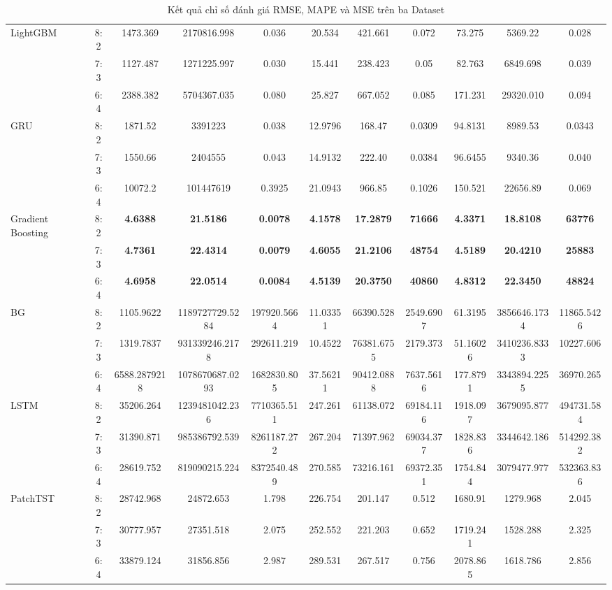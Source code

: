\documentclass[conference]{IEEEtran}
\begin{document}
\begin{table}[H]
\begin{tabular}{|l|c||c||c||c||c||c||c||c||c||c|}
\hline
LightGBM & 8:2 & 1473.369 & 2170816.998 & 0.036 & 20.534 & 421.661 & 0.072 & 73.275 & 5369.22 & 0.028  \\
    & 7:3 & 1127.487 & 1271225.997 & 0.030 & 15.441 & 238.423 & 0.05 & 82.763 & 6849.698 & 0.039  \\
    & 6:4 & 2388.382 & 5704367.035 & 0.080 & 25.827 & 667.052 & 0.085 & 171.231 & 29320.010 & 0.094  \\
\hline
GRU & 8:2 &1871.52  &3391223  &0.038 &12.9796 &168.47 &0.0309 &94.8131 &8989.53 &0.0343 \\
    & 7:3 &1550.66  &2404555  &0.043 &14.9132 &222.40 &0.0384 &96.6455 &9340.36 &0.040 \\
    & 6:4 &10072.2  &101447619  &0.3925 &21.0943 &966.85 &0.1026 &150.521 &22656.89 &0.069 \\
\hline
Gradient Boosting & 8:2 & \textbf{4.6388}  & \textbf{21.5186}  & \textbf{0.0078} & \textbf{4.1578} & \textbf{17.2879} & \textbf{71666} & \textbf{4.3371} & \textbf{18.8108} & \textbf{63776} \\
    & 7:3 & \textbf{4.7361}  & \textbf{22.4314}  & \textbf{0.0079} & \textbf{4.6055} & \textbf{21.2106} & \textbf{48754} & \textbf{4.5189} & \textbf{20.4210} & \textbf{25883} \\
    & 6:4 & \textbf{4.6958}  & \textbf{22.0514}  & \textbf{0.0084} & \textbf{4.5139} & \textbf{20.3750} & \textbf{40860} & \textbf{4.8312} & \textbf{22.3450} & \textbf{48824} \\
\hline
BG & 8:2 & 1105.9622 & 1189727729.5284 & 197920.5664 & 11.03351 &66390.528 &  2549.6907 &  61.3195 & 3856646.1734 & 11865.5426\\
    & 7:3 &  1319.7837 & 931339246.2178 & 292611.219 &  10.4522 & 76381.6755 & 2179.373 & 51.16026 & 3410236.8333 & 10227.606 \\
    & 6:4 & 6588.2879218 & 1078670687.0293 & 1682830.805 & 37.56211 & 90412.0888 & 7637.5616 & 177.8791 & 3343894.2255 & 36970.265 \\
\hline
LSTM & 8:2 & 35206.264 & 1239481042.236 & 7710365.511 & 247.261 & 61138.072 & 69184.116 & 1918.097 & 3679095.877 & 494731.584    \\
    & 7:3 & 31390.871 & 985386792.539 & 8261187.272 & 267.204 & 71397.962 & 69034.377 & 1828.836 & 3344642.186 & 514292.382   \\
    & 6:4 & 28619.752 & 819090215.224 & 8372540.489 & 270.585 & 73216.161 & 69372.351 & 1754.844 & 3079477.977 & 532363.836   \\
\hline
PatchTST & 8:2 & 28742.968 & 24872.653 & 1.798 & 226.754 & 201.147 & 0.512 & 1680.91 & 1279.968 & 2.045 \\
    & 7:3 & 30777.957 & 27351.518 & 2.075 & 252.552 & 221.203 & 0.652 & 1719.241 & 1528.288 & 2.325 \\
    & 6:4 & 33879.124 & 31856.856 & 2.987 & 289.531 & 267.517 & 0.756 & 2078.865 & 1618.786 & 2.856 \\
\hline
\end{tabular}
\caption{Kết quả chỉ số đánh giá RMSE, MAPE và MSE trên ba Dataset}
\end{table}    
\end{document}
